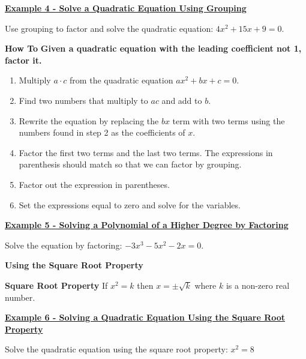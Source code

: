 \documentclass[12pt]{book}
\begin{document}
\vspace{1mm}

\underline{\textbf{Example 4 - Solve a Quadratic Equation Using Grouping}}

Use grouping to factor and solve the quadratic equation: $4x^2+15x+9=0$.


\newpage 
\begin{boxR}
 \textbf{How To}
    \vspace{1mm}
    \hline
    \vspace{2mm}
  \textbf{Given a quadratic equation with the leading coefficient \textbf{not} 1, factor it.} 
  \begin{enumerate}
      \item Multiply $a \cdot c$ from the quadratic equation $ax^2 +bx+c = 0$.
      \item Find two numbers that multiply to $ac$ and add to $b$.
      \item Rewrite the equation by replacing the $bx$ term with two terms using the numbers found in step 2 as the coefficients of $x$.
      \item Factor the first two terms and the last two terms. The expressions in parenthesis should match so that we can factor by grouping. 
      \item Factor out the expression in parentheses. 
      \item Set the expressions equal to zero and solve for the variables. 
  \end{enumerate}
\end{boxR}

\underline{\textbf{Example 5 - Solving a Polynomial of a Higher Degree by Factoring}}

Solve the equation by factoring: $-3x^3-5x^2-2x=0$.
\vspace{50mm}

{\large \textbf{Using the Square Root Property}}

\begin{boxR}
    \textbf{Square Root Property}
     \vspace{1mm}
    \hline
    \vspace{2mm}
    If $x^2 = k$ then $x = \pm \sqrt{k}$ where $k$ is a non-zero real number.
\end{boxR}
\vspace{3mm}

\underline{\textbf{Example 6 - Solving a Quadratic Equation Using the Square Root Property}}

Solve the quadratic equation using the square root property: $x^2=8$
 \newpage
\end{document}
